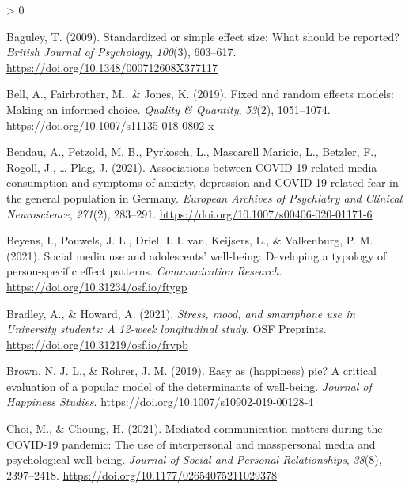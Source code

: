 \documentclass[
  english,
  man,floatsintext]{apa6}
\newlength{\cslhangindent}
\newenvironment{CSLReferences}[2] %
 {%
  \setlength{\parindent}{0pt}
  \ifodd #1 \everypar{\setlength{\hangindent}{\cslhangindent}}\ignorespaces\fi
  \ifnum #2 > 0
  \setlength{\parskip}{#2\baselineskip}
  \fi
 }%
 {}
\begin{document}
\hypertarget{refs}{}
\begin{CSLReferences}{1}{0}
\leavevmode\hypertarget{ref-baguleyStandardizedSimpleEffect2009}{}%
Baguley, T. (2009). Standardized or simple effect size: {What} should be reported? \emph{British Journal of Psychology}, \emph{100}(3), 603--617. \url{https://doi.org/10.1348/000712608X377117}

\leavevmode\hypertarget{ref-bellFixedRandomEffects2019}{}%
Bell, A., Fairbrother, M., \& Jones, K. (2019). Fixed and random effects models: Making an informed choice. \emph{Quality \& Quantity}, \emph{53}(2), 1051--1074. \url{https://doi.org/10.1007/s11135-018-0802-x}

\leavevmode\hypertarget{ref-bendauAssociationsCOVID19Related2021}{}%
Bendau, A., Petzold, M. B., Pyrkosch, L., Mascarell Maricic, L., Betzler, F., Rogoll, J., \ldots{} Plag, J. (2021). Associations between {COVID}-19 related media consumption and symptoms of anxiety, depression and {COVID}-19 related fear in the general population in {Germany}. \emph{European Archives of Psychiatry and Clinical Neuroscience}, \emph{271}(2), 283--291. \url{https://doi.org/10.1007/s00406-020-01171-6}

\leavevmode\hypertarget{ref-beyensSocialMediaUse2021}{}%
Beyens, I., Pouwels, J. L., Driel, I. I. van, Keijsers, L., \& Valkenburg, P. M. (2021). Social media use and adolescents' well-being: {Developing} a typology of person-specific effect patterns. \emph{Communication Research}. \url{https://doi.org/10.31234/osf.io/ftygp}

\leavevmode\hypertarget{ref-bradleyStressMoodSmartphone2021}{}%
Bradley, A., \& Howard, A. (2021). \emph{Stress, mood, and smartphone use in {University} students: {A} 12-week longitudinal study}. OSF Preprints. \url{https://doi.org/10.31219/osf.io/frvpb}

\leavevmode\hypertarget{ref-brownEasyHappinessPie2019}{}%
Brown, N. J. L., \& Rohrer, J. M. (2019). Easy as (happiness) pie? {A} critical evaluation of a popular model of the determinants of well-being. \emph{Journal of Happiness Studies}. \url{https://doi.org/10.1007/s10902-019-00128-4}

\leavevmode\hypertarget{ref-choiMediatedCommunicationMatters2021}{}%
Choi, M., \& Choung, H. (2021). Mediated communication matters during the {COVID}-19 pandemic: {The} use of interpersonal and masspersonal media and psychological well-being. \emph{Journal of Social and Personal Relationships}, \emph{38}(8), 2397--2418. \url{https://doi.org/10.1177/02654075211029378}


\end{CSLReferences}
\end{document}
